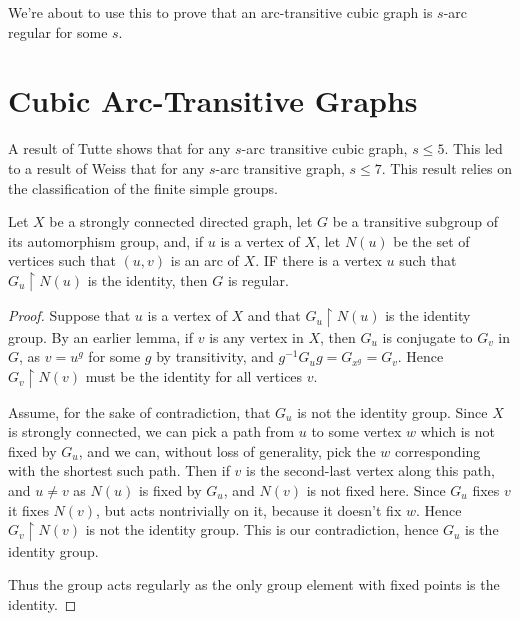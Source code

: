 We're about to use this to prove that an arc-transitive cubic graph is $s$-arc regular for some $s$.

\section*{Cubic Arc-Transitive Graphs}

A result of Tutte shows that for any $s$-arc transitive cubic graph, $s\leq 5$.  This led to a result of Weiss that for any $s$-arc transitive graph, $s\leq 7$.  This result relies on the classification of the finite simple groups.

\begin{lemma}
	Let $X$ be a strongly connected directed graph, let $G$ be a transitive subgroup of its automorphism group, and, if $u$ is a vertex of $X$, let $N(u)$ be the set of vertices such that $(u,v)$ is an arc of $X$.  IF there is a vertex $u$ such that $G_u\upharpoonright N(u)$ is the identity, then $G$ is regular.
\end{lemma}
\begin{proof}
	
	Suppose that $u$ is a vertex of $X$ and that $G_u\upharpoonright N(u)$ is the identity group.  By an earlier lemma, if $v$ is any vertex in $X$, then $G_u$ is conjugate to $G_v$ in $G$, as $v=u^g$ for some $g$ by transitivity, and $g^{-1}G_u g = G_{x^g}=G_v$.  Hence $G_v\upharpoonright N(v)$ must be the identity for all vertices $v$.
	
	Assume, for the sake of contradiction, that $G_u$ is not the identity group.  Since $X$ is strongly connected, we can pick a path from $u$ to some vertex $w$ which is not fixed by $G_u$, and we can, without loss of generality, pick the $w$ corresponding with the shortest such path.  Then if $v$ is the second-last vertex along this path, and $u\neq v$ as $N(u)$ is fixed by $G_u$, and $N(v)$ is not fixed here.  Since $G_u$ fixes $v$ it fixes $N(v)$, but acts nontrivially on it, because it doesn't fix $w$.  Hence $G_v\upharpoonright N(v)$ is not the identity group.  This is our contradiction, hence $G_u$ is the identity group.
	
	Thus the group acts regularly as the only group element with fixed points is the identity.
	
	
	
	
	
	
	
\end{proof}





